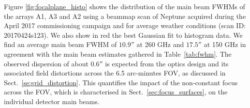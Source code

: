 Figure \ref{fig:focalplane_histo} shows the distribution of the
main beam FWHMs of the arrays A1, A3 and A2 using a beammap
scan of Neptune acquired during the April 2017 commissioning
campaign and for average weather conditions (scan ID: 20170424s123).
We also
show in red the best Gaussian fit to histogram data. We find an
average main beam FWHM of $10.9''$ at 260 GHz and $17.5''$ at
150 GHz in agreement with the main beam estimates gathered in
Table~\ref{tab:fwhm}.
The observed dispersion of about $0.6''$ is expected from the optics design and its associated
field distortions across the 6.5 arc-minutes FOV, as discussed in
Sect.~\ref{se:grid_distortion}. This quantifies the impact of the
non-constant focus across the FOV, which is characterised in
Sect.~\ref{sec:focus_surfaces}, on the individual detector main beams.  





